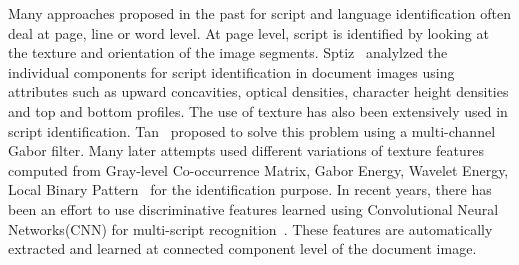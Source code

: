 
Many approaches proposed in the past for script and language identification often deal at page, line or word level. At page level, script is identified by looking at the texture and orientation of the image segments. Sptiz~\cite{Spitz97} analylzed the individual components for script identification in document images using attributes such as upward concavities, optical densities, character height densities and top and bottom profiles. The use of texture has also been extensively used in script identification. Tan~\cite{Tan98} proposed to solve this problem using a multi-channel Gabor filter. Many later attempts used different variations of texture features computed from Gray-level Co-occurrence Matrix, Gabor Energy, Wavelet Energy, Local Binary Pattern~\cite{Busch05,Ferrer13,Pati,sukalpa09} for the identification purpose. In recent years, there has been an effort to use discriminative features learned using Convolutional Neural Networks(\textsc{CNN}) for multi-script recognition~\cite{Rashid10}. These features are automatically extracted and learned at connected component level of the document image. %


